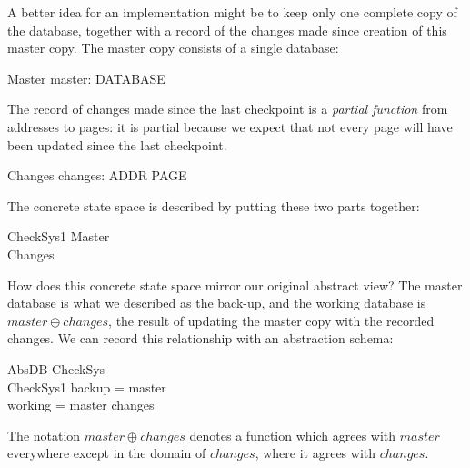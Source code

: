 \documentclass[12pt]{article}
\begin{document}
A better idea for an implementation might be to keep only one complete
copy of the database, together with a record of
the changes made since creation of this master copy.
The master copy consists of a single database:
\begin{schema}{Master}
	master: DATABASE
\end{schema}
The record of changes made since the last checkpoint is a
{\em partial function} from addresses to pages: it is partial because
we expect that not every page will have been updated since the last
checkpoint.
\begin{schema}{Changes}
	changes: ADDR \pfun PAGE
\end{schema}
The concrete state space is described by putting these two parts together:
\begin{schema}{CheckSys1}
	Master \\
	Changes
\end{schema}
How does this concrete state space mirror our original abstract view?
The master database is what we described as the back-up, and
the working database is $master \oplus changes$, the result
of updating the master copy with the recorded changes. We can record
this relationship with an abstraction schema:
\begin{schema}{AbsDB}
	CheckSys \\
	CheckSys1
\where  
	backup = master \\
	working = master \oplus changes
\end{schema}
The notation $master \oplus changes$ denotes a function which agrees
with $master$ everywhere except in the domain of $changes$, where it
agrees with $changes$.
\end{document}
